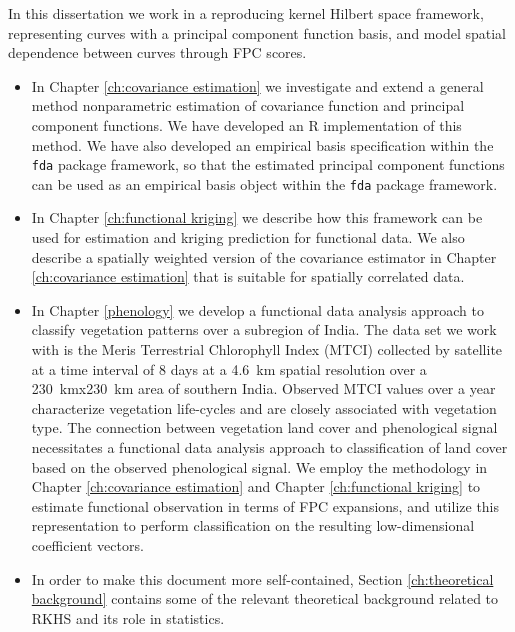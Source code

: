 In this dissertation we work in a reproducing kernel Hilbert space framework, representing curves with a principal component function basis, and model spatial dependence between curves through FPC scores.  
\begin{itemize}
\item In Chapter \ref{ch:covariance estimation} we investigate and extend a general method nonparametric estimation of covariance function and principal component functions. We have developed an R implementation of this method. We have also developed an empirical basis specification within the \texttt{fda} package framework, so that the estimated principal component functions can be used as an empirical basis object within the \texttt{fda} package framework.  %

\item In Chapter \ref{ch:functional kriging} we describe how this framework can be used for estimation and kriging prediction for functional data. We also describe a spatially weighted version of the covariance estimator in Chapter \ref{ch:covariance estimation} that is suitable for spatially correlated data.

\item  In Chapter \ref{phenology} we develop a functional data analysis approach to classify vegetation patterns over a subregion of India. The data set we work with is the Meris Terrestrial Chlorophyll Index (MTCI) collected by satellite at a time interval of 8 days at a 4.6~km spatial resolution over a 230~kmx230~km area of southern India. Observed MTCI values over a year characterize vegetation life-cycles and are closely associated with vegetation type. The connection between vegetation land cover and phenological signal necessitates a functional data analysis approach to classification of land cover based on the observed phenological signal. We employ the methodology in Chapter \ref{ch:covariance estimation} and Chapter \ref{ch:functional kriging} to estimate functional observation in terms of FPC expansions, and utilize this representation to perform classification on the resulting low-dimensional coefficient vectors. 

\item In order to make this document more self-contained, Section \ref{ch:theoretical background} contains some of the relevant theoretical background related to RKHS and its role in statistics. 
\end{itemize}


